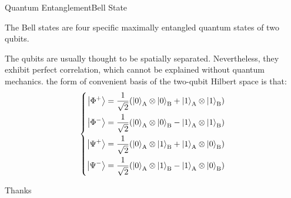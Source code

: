 \documentclass[UTF8,beamer,serif,ctexart]{beamer}
\begin{document}
\begin{frame}{Quantum Entanglement}{Bell State}
	\par The Bell states are four specific maximally entangled quantum states of two qubits.
	\par The qubits are usually thought to be spatially separated. Nevertheless, they exhibit perfect correlation, which cannot be explained without quantum mechanics. the form of convenient basis of the two-qubit Hilbert space is that:
\begin{equation}
	\left\{
		\begin{aligned}
			\left|\Phi^{+}\right\rangle & = \dfrac{1}{\sqrt{2}}(\left|0\right\rangle_{\rm{A}}\otimes\left|0\right\rangle_{\rm{B}}+\left|1\right\rangle_{\rm{A}}\otimes\left|1\right\rangle_{\rm{B}})	\\
			\left|\Phi^{-}\right\rangle & = \dfrac{1}{\sqrt{2}}(\left|0\right\rangle_{\rm{A}}\otimes\left|0\right\rangle_{\rm{B}}-\left|1\right\rangle_{\rm{A}}\otimes\left|1\right\rangle_{\rm{B}})	\\
			\left|\Psi^{+}\right\rangle & = \dfrac{1}{\sqrt{2}}(\left|0\right\rangle_{\rm{A}}\otimes\left|1\right\rangle_{\rm{B}}+\left|1\right\rangle_{\rm{A}}\otimes\left|0\right\rangle_{\rm{B}})	\\
			\left|\Psi^{-}\right\rangle & = \dfrac{1}{\sqrt{2}}(\left|0\right\rangle_{\rm{A}}\otimes\left|1\right\rangle_{\rm{B}}-\left|1\right\rangle_{\rm{A}}\otimes\left|0\right\rangle_{\rm{B}})	\\
		\end{aligned}
	\right.
\end {equation}	
\end{frame}

\begin{frame}{}{}
	\par Thanks
\end{frame}
\end{document}
